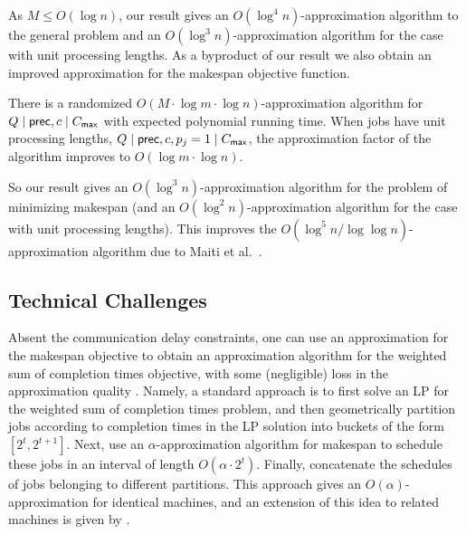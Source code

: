   As $M \leq O(\log n)$, our result gives an  $O(\log^4 n)$-approximation algorithm to the general problem and an $O(\log^3 n)$-approximation algorithm for the case with unit processing lengths.
  As a byproduct of our result we also obtain an improved approximation for the makespan objective function.
  
  
  \begin{theorem} \label{thm:colmain}
  There is a randomized $O(M \cdot \log m \cdot \log n)$-approximation algorithm for $Q \mid \mathsf{prec}, c \mid C_{\mathsf{max}}$ with expected polynomial running time. When jobs have unit processing lengths, $Q \mid \mathsf{prec}, c, p_j = 1 \mid C_{\mathsf{max}}$, the approximation factor of the algorithm improves to  $O(\log m \cdot \log n)$.
  \end{theorem}
  
  So our result gives an $O(\log^3 n)$-approximation algorithm for the problem of minimizing makespan (and an $O(\log^2 n)$-approximation algorithm for the case with unit processing lengths). 
  This improves the $O(\log^5 n / \log \log n)$-approximation algorithm due to Maiti {et al.}~\cite{MRSSV}.
  
  
  \subsection{Technical Challenges}
  \label{sec:challenges}
  Absent the communication delay constraints, one can use an approximation for the makespan objective to obtain an approximation algorithm for the weighted sum of completion times objective, with some (negligible) loss in the approximation quality \cite{hall1997scheduling,queyranne2002approximation,li2020scheduling}.
  Namely, a standard approach is to first solve an LP for the weighted sum of completion times problem, and then geometrically partition jobs according to completion times  in the LP solution
  into buckets of the form $[2^t, 2^{t+1}]$.
  Next, use an $\alpha$-approximation algorithm for makespan to schedule these jobs in an interval of length $O(\alpha \cdot 2^t)$.
  Finally, concatenate the schedules of jobs belonging to different partitions.
  This approach gives an $O(\alpha)$-approximation for identical machines, and an extension of this idea to related machines is given by \cite{UniformlyRelatedMachinesWithPrecedences-ChudakShmoys-JALG99}.
  
